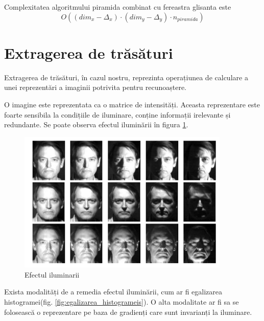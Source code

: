 Complexitatea algoritmului piramida combinat cu fereastra glisanta este 
$${O((dim_x-\Delta_x) \cdot (dim_y-\Delta_y) \cdot n_{piramida})}$$

\pagebreak
\section{Extragerea de trăsături}

Extragerea de trăsături, în cazul nostru, reprezinta operațiunea de calculare a unei reprezentări a imaginii potrivita pentru recunoaștere.

O imagine este reprezentata ca o matrice de intensități.
Aceasta reprezentare este foarte sensibila la condițiile de iluminare, conține informații irelevante și redundante.
Se poate observa efectul iluminării în figura \ref{fig:efectul_iluminarii}.

\begin{figure}[H]
	\centering
		\includegraphics[width=0.90\textwidth]{imagini/efectul_iluminarii.png}
	\caption{Efectul iluminarii\protect\footnotemark}
	\label{fig:efectul_iluminarii}
\end{figure}


Exista modalități de a remedia efectul iluminării, cum ar fi egalizarea histogramei(fig. \ref{fig:egalizarea_histogrameis}).
O alta modalitate ar fi sa se folosească o reprezentare pe baza de gradienți care sunt invarianți la iluminare.

